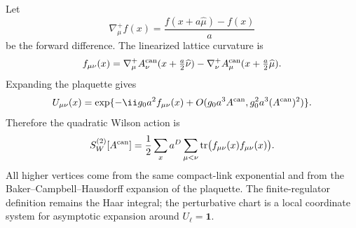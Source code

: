 Let
\[
  \nabla_\mu^+ f(x)=\frac{f(x+a\widehat\mu)-f(x)}{a}
\]
be the forward difference.  The linearized lattice curvature is
\begin{equation}
  f_{\mu\nu}(x)
  =
  \nabla_\mu^+ A_\nu^{\rm can}(x+\tfrac a2\widehat\nu)
  -
  \nabla_\nu^+ A_\mu^{\rm can}(x+\tfrac a2\widehat\mu).
  \label{eq:lattice-linearized-curvature}
\end{equation}
Expanding the plaquette gives
\begin{equation}
  U_{\mu\nu}(x)
  =
  \exp\{-\ii g_0 a^2 f_{\mu\nu}(x)
  +O(g_0a^3A^{\rm can},g_0^2a^3(A^{\rm can})^2)\}.
  \label{eq:lattice-plaquette-perturbative-expansion}
\end{equation}
Therefore the quadratic Wilson action is
\begin{equation}
  S_W^{(2)}[A^{\rm can}]
  =
  \frac12
  \sum_x a^D\sum_{\mu<\nu}
  \operatorname{tr}\bigl(f_{\mu\nu}(x)f_{\mu\nu}(x)\bigr).
  \label{eq:lattice-quadratic-wilson-action}
\end{equation}
All higher vertices come from the same compact-link exponential and from the
Baker--Campbell--Hausdorff expansion of the plaquette.  The finite-regulator
definition remains the Haar integral; the perturbative chart is a local
coordinate system for asymptotic expansion around \(U_\ell=\mathbf 1\).

